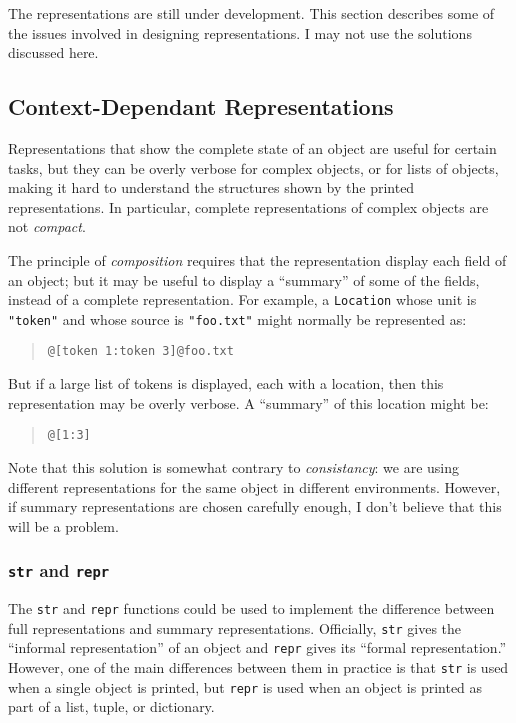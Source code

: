 \documentclass[11pt]{article}
\begin{document}
The representations are still under development.  This section
describes some of the issues involved in designing representations.  I
may not use the solutions discussed here.

\subsection{Context-Dependant Representations}

  Representations that show the complete state of an object are useful
  for certain tasks, but they can be overly verbose for complex
  objects, or for lists of objects, making it hard to understand the
  structures shown by the printed representations.  In particular,
  complete representations of complex objects are not \emph{compact}.

  The principle of \emph{composition} requires that the representation
  display each field of an object; but it may be useful to display a
  ``summary'' of some of the fields, instead of a complete
  representation.  For example, a \texttt{Location} whose unit is
  \texttt{"token"} and whose source is \texttt{"foo.txt"} might
  normally be represented as:

  \begin{quote}
    \texttt{@[token 1:token 3]@foo.txt}
  \end{quote}

  But if a large list of tokens is displayed, each with a location,
  then this representation may be overly verbose.  A ``summary'' of
  this location might be:

  \begin{quote}
    \texttt{@[1:3]}
  \end{quote}

  Note that this solution is somewhat contrary to \emph{consistancy}:
  we are using different representations for the same object in
  different environments.  However, if summary representations are
  chosen carefully enough, I don't believe that this will be a
  problem.

\subsubsection{\texttt{str} and \texttt{repr}}

  The \texttt{str} and \texttt{repr} functions could be used to
  implement the difference between full representations and summary
  representations.  Officially, \texttt{str} gives the ``informal
  representation'' of an object and \texttt{repr} gives its ``formal
  representation.''  However, one of the main differences between them
  in practice is that \texttt{str} is used when a single object is
  printed, but \texttt{repr} is used when an object is printed as part
  of a list, tuple, or dictionary.  
\end{document}
